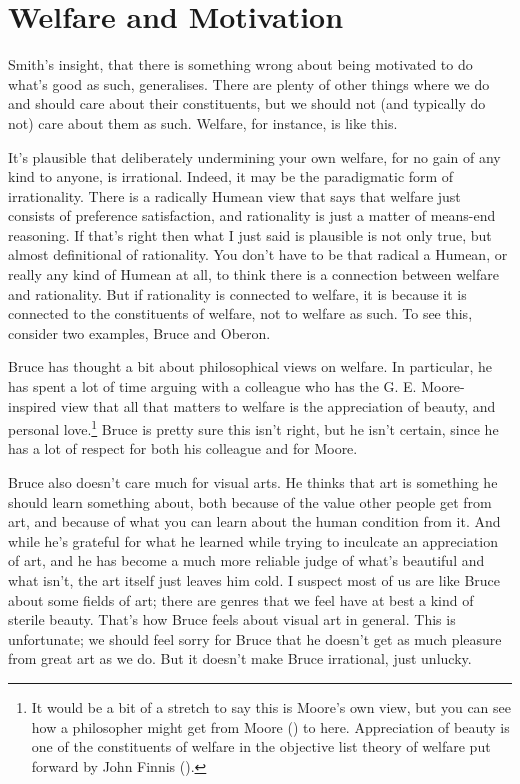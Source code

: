 \documentclass[
  10pt,
  letterpaper,
  twoside]{scrbook}
\begin{document}
\section{Welfare and Motivation}\label{welfareandmotivation}

Smith's insight, that there is something wrong about being motivated to
do what's good as such, generalises. There are plenty of other things
where we do and should care about their constituents, but we should not
(and typically do not) care about them as such. Welfare, for instance,
is like this.

It's plausible that deliberately undermining your own welfare, for no
gain of any kind to anyone, is irrational. Indeed, it may be the
paradigmatic form of irrationality. There is a radically Humean view
that says that welfare just consists of preference satisfaction, and
rationality is just a matter of means-end reasoning. If that's right
then what I just said is plausible is not only true, but almost
definitional of rationality. You don't have to be that radical a Humean,
or really any kind of Humean at all, to think there is a connection
between welfare and rationality. But if rationality is connected to
welfare, it is because it is connected to the constituents of welfare,
not to welfare as such. To see this, consider two examples, {Bruce} and
{Oberon}.

{Bruce} has thought a bit about philosophical views on welfare. In
particular, he has spent a lot of time arguing with a colleague who has
the G. E. Moore-inspired view that all that matters to welfare is the
appreciation of beauty, and personal love.\footnote{It would be a bit of
  a stretch to say this is Moore's own view, but you can see how a
  philosopher might get from Moore () to
  here. Appreciation of beauty is one of the constituents of welfare in
  the objective list theory of welfare put forward by John Finnis
  ().} {Bruce} is pretty sure
this isn't right, but he isn't certain, since he has a lot of respect
for both his colleague and for Moore.

{Bruce} also doesn't care much for visual arts. He thinks that art is
something he should learn something about, both because of the value
other people get from art, and because of what you can learn about the
human condition from it. And while he's grateful for what he learned
while trying to inculcate an appreciation of art, and he has become a
much more reliable judge of what's beautiful and what isn't, the art
itself just leaves him cold. I suspect most of us are like {Bruce} about
some fields of art; there are genres that we feel have at best a kind of
sterile beauty. That's how {Bruce} feels about visual art in general.
This is unfortunate; we should feel sorry for {Bruce} that he doesn't
get as much pleasure from great art as we do. But it doesn't make
{Bruce} irrational, just unlucky.
\end{document}
